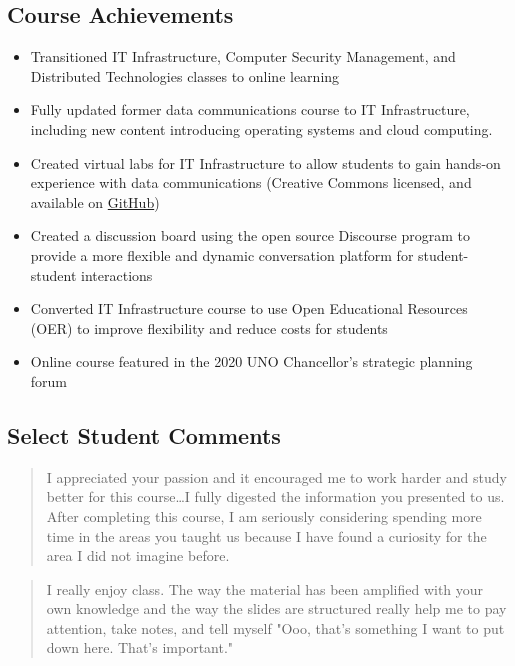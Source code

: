\documentclass[10pt, letter]{article}
\begin{document}
\subsection*{Course Achievements}
\begin{itemize}
	\itemsep0em
	\item Transitioned IT Infrastructure, Computer Security Management, and Distributed Technologies classes to online learning
	\item Fully updated former data communications course to IT Infrastructure, including new content introducing operating systems and cloud computing.
	\item Created virtual labs for IT Infrastructure to allow students to gain hands-on experience with data communications (Creative Commons licensed, and available on \href{https://github.com/rschuetzler/datacom-labs}{GitHub})
	\item Created a discussion board using the open source Discourse program to provide a more flexible and dynamic conversation platform for student-student interactions
	\item Converted IT Infrastructure course to use Open Educational Resources (OER) to improve flexibility and reduce costs for students
	\item Online course featured in the 2020 UNO Chancellor's strategic planning forum
\end{itemize}


\subsection*{Select Student Comments}

\begin{quote}
	I appreciated your passion and it encouraged me to work harder and study better for this
	course\ldots I fully digested the information you presented to us. After completing this
	course, I am seriously considering spending more time in the areas you taught us because
	I have found a curiosity for the area I did not imagine before.
\end{quote}

\begin{quote}
	I really enjoy class. The way the material has been amplified with your own knowledge
	and the way the slides are structured really help me to pay attention, take notes, and
	tell myself "Ooo, that's something I want to put down here. That's important."
\end{quote}
\end{document}

